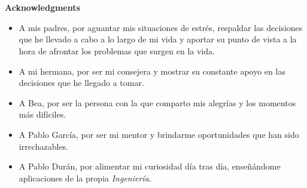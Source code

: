 
\chapter*{}
\begin{center}
\textbf{Acknowledgments}
\end{center}

\begin{itemize}

\item A mis padres, por aguantar mis situaciones de estrés, respaldar las decisiones que he llevado a cabo a lo largo de mi vida y aportar su punto de vista a la hora de afrontar los problemas que surgen en la vida.
\item A mi hermana, por ser mi consejera y mostrar su constante apoyo en las decisiones que he llegado a tomar.
\item A Bea, por ser la persona con la que comparto mis alegrías y los momentos más difíciles.
\item A Pablo García, por ser mi mentor y brindarme oportunidades que han sido irrechazables.
\item A Pablo Durán, por alimentar mi curiosidad día tras día, enseñándome aplicaciones de la propia \textit{Ingeniería}.

\end{itemize}

\newpage